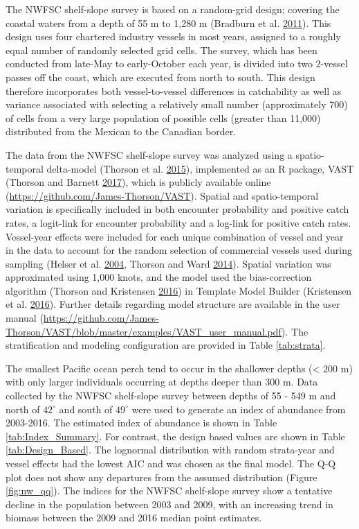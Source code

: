 \documentclass[12pt,]{article}
\begin{document}
The NWFSC shelf-slope survey is based on a random-grid design; covering
the coastal waters from a depth of 55 m to 1,280 m (Bradburn et al.
\protect\hyperlink{ref-bradburn_2003_2011}{2011}). This design uses four
chartered industry vessels in most years, assigned to a roughly equal
number of randomly selected grid cells. The survey, which has been
conducted from late-May to early-October each year, is divided into two
2-vessel passes off the coast, which are executed from north to south.
This design therefore incorporates both vessel-to-vessel differences in
catchability as well as variance associated with selecting a relatively
small number (approximately 700) of cells from a very large population
of possible cells (greater than 11,000) distributed from the Mexican to
the Canadian border.

The data from the NWFSC shelf-slope survey was analyzed using a
spatio-temporal delta-model (Thorson et al.
\protect\hyperlink{ref-thorson_geostatistical_2015}{2015}), implemented
as an R package, VAST (Thorson and Barnett
\protect\hyperlink{ref-thorson_comparing_2017}{2017}), which is publicly
available online (\url{https://github.com/James-Thorson/VAST}). Spatial
and spatio-temporal variation is specifically included in both encounter
probability and positive catch rates, a logit-link for encounter
probability and a log-link for positive catch rates. Vessel-year effects
were included for each unique combination of vessel and year in the data
to account for the random selection of commercial vessels used during
sampling (Helser et al.
\protect\hyperlink{ref-helser_generalized_2004}{2004}, Thorson and Ward
\protect\hyperlink{ref-thorson_accounting_2014}{2014}). Spatial
variation was approximated using 1,000 knots, and the model used the
bias-correction algorithm (Thorson and Kristensen
\protect\hyperlink{ref-thorson_implementing_2016}{2016}) in Template
Model Builder (Kristensen et al.
\protect\hyperlink{ref-kristensen_tmb:_2016}{2016}). Further details
regarding model structure are available in the user manual
(\url{https://github.com/James-Thorson/VAST/blob/master/examples/VAST_user_manual.pdf}).
The stratification and modeling configuration are provided in Table
\ref{tab:strata}.

The smallest Pacific ocean perch tend to occur in the shallower depths
(\textless{} 200 m) with only larger individuals occurring at depths
deeper than 300 m. Data collected by the NWFSC shelf-slope survey
between depths of 55 - 549 m and north of \(42^\circ\) and south of
\(49^\circ\) were used to generate an index of abundance from 2003-2016.
The estimated index of abundance is shown in Table
\ref{tab:Index_Summary}. For contrast, the design based values are shown
in Table \ref{tab:Design_Based}. The lognormal distribution with random
strata-year and vessel effects had the lowest AIC and was chosen as the
final model. The Q-Q plot does not show any departures from the assumed
distribution (Figure \ref{fig:nw_qq}). The indices for the NWFSC
shelf-slope survey show a tentative decline in the population between
2003 and 2009, with an increasing trend in biomass between the 2009 and
2016 median point estimates.
\end{document}
